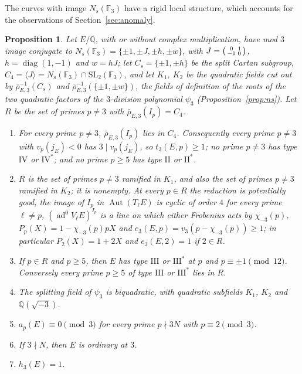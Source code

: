 \documentclass[11pt]{amsart}
\newtheorem{proposition}[theorem]{Proposition}
\theoremstyle{definition}
\newcommand{\Q}{\mathbb{Q}}
\newcommand{\F}{\mathbb{F}}
\newcommand{\ad}{\operatorname{ad}^0}
\newcommand{\SL}{\mathrm{SL}}
\begin{document}
The curves with image $N_s(\F_3)$ have a rigid local structure, which accounts for the observations of Section~\ref{sec:anomaly}.

\begin{proposition}\label{prop:ns-structure}
Let $E/\Q$, with or without complex multiplication, have mod $3$ image conjugate to $N_s(\F_3)=\{\pm1,\pm J,\pm h,\pm w\}$, with $J=\begin{psmallmatrix}0&1\\-1&0\end{psmallmatrix}$, $h=\operatorname{diag}(1,-1)$ and $w=hJ$; let $C_s=\{\pm1,\pm h\}$ be the split Cartan subgroup, $C_4=\langle J\rangle=N_s(\F_3)\cap\SL_2(\F_3)$, and let $K_1$, $K_2$ be the quadratic fields cut out by $\bar\rho_{E,3}^{-1}(C_s)$ and $\bar\rho_{E,3}^{-1}(\{\pm1,\pm w\})$, the fields of definition of the roots of the two quadratic factors of the $3$-division polynomial $\psi_3$ (Proposition~\ref{prop:ns}). Let $R$ be the set of primes $p\ne3$ with $\bar\rho_{E,3}(I_p)=C_4$.
\begin{enumerate}
\item[(i)] For every prime $p\ne3$, $\bar\rho_{E,3}(I_p)$ lies in $C_4$. Consequently every prime $p\ne3$ with $v_p(j_E)<0$ has $3\mid v_p(j_E)$, so $t_3(E,p)\ge1$; no prime $p\ne3$ has type $\mathrm{IV}$ or $\mathrm{IV}^*$; and no prime $p\ge5$ has type $\mathrm{II}$ or $\mathrm{II}^*$.
\item[(ii)] $R$ is the set of primes $p\ne3$ ramified in $K_1$, and also the set of primes $p\ne3$ ramified in $K_2$; it is nonempty. At every $p\in R$ the reduction is potentially good, the image of $I_p$ in $\operatorname{Aut}(T_\ell E)$ is cyclic of order $4$ for every prime $\ell\ne p$, $(\ad V_\ell E)^{I_p}$ is a line on which either Frobenius acts by $\chi_{-3}(p)$, $P_p(X)=1-\chi_{-3}(p)pX$ and $e_3(E,p)=v_3(p-\chi_{-3}(p))\ge1$; in particular $P_2(X)=1+2X$ and $e_3(E,2)=1$ if $2\in R$.
\item[(iii)] If $p\in R$ and $p\ge5$, then $E$ has type $\mathrm{III}$ or $\mathrm{III}^*$ at $p$ and $p\equiv\pm1\pmod{12}$. Conversely every prime $p\ge5$ of type $\mathrm{III}$ or $\mathrm{III}^*$ lies in $R$.
\item[(iv)] The splitting field of $\psi_3$ is biquadratic, with quadratic subfields $K_1$, $K_2$ and $\Q(\sqrt{-3})$.
\item[(v)] $a_p(E)\equiv0\pmod3$ for every prime $p\nmid3N$ with $p\equiv2\pmod3$.
\item[(vi)] If $3\nmid N$, then $E$ is ordinary at $3$.
\item[(vii)] $h_3(E)=1$.
\end{enumerate}
\end{proposition}
\end{document}
